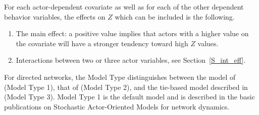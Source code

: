 \documentclass[a4paper,fleqn,11pt]{article}
\newcommand{\+}{\, + \,}
\newcommand{\SI}{{\sf SIENA }}
\newcommand{\si}{{\sf SIENA}}
\begin{document}
{For each actor-dependent covariate as well as for each of the other
dependent behavior variables,
the effects on $Z$ which can be included is the following.
\begin{enumerate}
\item The main effect: a positive value implies that actors with a
      higher value on the covariate will have a stronger tendency
      toward high $Z$ values.

\item Interactions between two or three actor variables, see
      Section~\ref{S_int_eff}.
\end{enumerate}

\iffalse
For directed networks, the Model Type distinguishes between
the model of \citet{Snijders01} (Model Type 1),
that of \citet{Snijders03} (Model Type 2),
and the tie-based model described in \citet{Snijders06} (Model Type 3).
Model Type 1 is the default model and is
described in the basic publications on Stochastic Actor-Oriented
Models for network dynamics.

}
\end{document}
